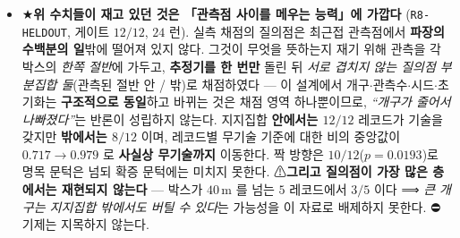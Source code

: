 \documentclass[11pt]{report}
\numberwithin{equation}{chapter}
\numberwithin{figure}{chapter}
\numberwithin{table}{chapter}
\begin{document}
\begin{itemize}
        ⛔\textbf{단 그 상대는 \emph{이 절의 팔}(bank-MMSE)이지 본 논문이 제안하는 표현이
        아니다} --- 실측 입력에서 라우터가 무조건 그쪽으로 보내므로 그 배치의 결과 행에는
        제안 표현의 열이 아예 없다. ⟹ \textbf{위 밀도 문장은 \emph{비교자}에 대한 것이며,
        학습된 사전에 대해서는 아무것도 말하지 않는다.}
        \textbf{종전 근거}: 격자 기반 앙상블 칼만 기준선 2 종을 실측 기하에 적용하였으나
        모두 무기술 기준을 넘지 못하였다(각각 무기술 수준, 0/12).
        ⚠\textbf{선행 재현은 참조 구현과 대조할 수 없었다} --- 해당 연구의 공개 저장소에
        필터 핵심이 포함되어 있지 않다(\S\ref{sec:closest-prior}). 진단 결과 원인은 관측 밀도가 아니라
        진폭 과증폭이다 --- 관측을 10 배로 늘리면 오히려 악화하고, 예측장 분산이 참 장의
        1.0--4.2 배이다. 개구가 가장 큰 레코드(220$\times$240\,m)에서만 대등에 근접한다.
  \item ★\textbf{위 수치들이 재고 있던 것은 「관측점 사이를 메우는 능력」에 가깝다}
        (\texttt{R8-HELDOUT}, 게이트 $12/12$, $24$ 런). 실측 채점의 질의점은 최근접 관측점에서
        \textbf{파장의 수백분의 일}밖에 떨어져 있지 않다. 그것이 무엇을 뜻하는지 재기 위해
        관측을 각 박스의 \emph{한쪽 절반}에 가두고, \textbf{추정기를 한 번만} 돌린 뒤
        \emph{서로 겹치지 않는 질의점 부분집합 둘}(관측된 절반 안 / 밖)로 채점하였다
        --- 이 설계에서 개구$\cdot$관측수$\cdot$시드$\cdot$초기화는 \textbf{구조적으로 동일}하고
        바뀌는 것은 채점 영역 하나뿐이므로, \emph{``개구가 줄어서 나빠졌다''}는 반론이
        성립하지 않는다. 지지집합 \textbf{안에서는 $12/12$} 레코드가 기술을 갖지만
        \textbf{밖에서는 $8/12$} 이며, 레코드별 무기술 기준에 대한 비의 중앙값이
        $0.717 \to 0.979$ 로 \textbf{사실상 무기술까지} 이동한다. 짝 방향은
        \textbf{$10/12$}($p = 0.0193$)로 명목 문턱은 넘되 확증 문턱에는 미치지 못한다.
        ⚠\textbf{그리고 질의점이 가장 많은 층에서는 재현되지 않는다} --- 박스가 $40$\,m 를
        넘는 $5$ 레코드에서 $3/5$ 이다 ⟹ \emph{큰 개구는 지지집합 밖에서도 버틸 수 있다}는
        가능성을 이 자료로 배제하지 못한다. ⛔기제는 지목하지 않는다.

\end{itemize}
\end{document}
